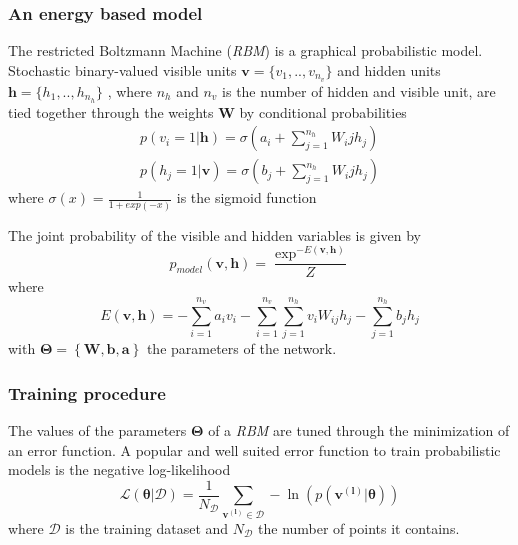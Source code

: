 \documentclass{article}
\begin{document}
\subsubsection{An energy based model}
The restricted Boltzmann Machine (\textit{RBM}) is a graphical probabilistic model. Stochastic binary-valued 
visible units $\bm{v} = \{ v_1, .., v_{n_v} \}$ and hidden units $\bm{h} = \{ h_1, .., h_{n_h} \}$ , where $n_h$ and $n_v$ is the number of hidden and visible unit, are tied together through the weights $\bm{W}$ by conditional probabilities
\begin{align}
\label{eq:conditional_rbm}
p(v_i=1|\bm{h}) = \sigma(a_i + \sum_{j=1}^{n_h} W_ij h_j)\\
p(h_j=1|\bm{v}) = \sigma(b_j + \sum_{j=1}^{n_h} W_ij h_j)
\end{align}
where $\sigma(x) = \frac{1}{1 + exp(-x)}$ is the sigmoid function

The joint probability of the visible and hidden variables is given by
\begin{equation}
p_{model}(\bm{v},\bm{h}) =  \frac{\exp^{-E(\bm{v},\bm{h})}}{Z}
\end{equation}
where
\begin{equation}
\label{eq:energy}
E(\bm{v},\bm{h}) = - \sum_{i=1}^{n_{v}} a_i v_{i}  - \sum_{i=1}^{n_v} \sum_{j=1}^{n_h} v_{i} W_{ij} h_{j} - \sum_{j = 1}^{n_h} b_j h_{j}
\end{equation}
with $\bm{\Theta} = \left\{\bm{W},\bm{b},\bm{a}\right\}$ the parameters of the network.

\subsubsection{Training procedure}
The values of the parameters $\bm{\Theta}$ of a \textit{RBM} are tuned through the minimization of an error function.
A popular and well suited error function to train probabilistic models is the negative log-likelihood 
\begin{equation}
\label{eq:likelihood}
\mathcal{L(\bm{\theta}|\mathcal{D})}  = \frac{1}{N_{\mathcal{D}}} \sum_{\bm{v^{(l)}} \in \mathcal{D}} - \ln \left( p(\bm{v^{(l)}}|\bm{\theta})\right)
\end{equation}
where $\mathcal{D}$ is the training dataset and $N_{\mathcal{D}}$ the number of points it contains.
\end{document}
